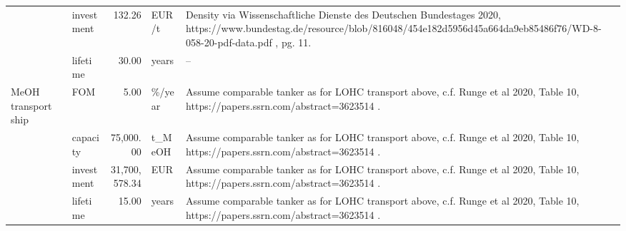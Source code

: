 \begin{longtable}{p{5cm}p{3cm}rp{3cm}p{11cm}}
                      & investment &         132.26 &                             EUR/t &                                                                                                                                              Density via Wissenschaftliche Dienste des Deutschen Bundestages 2020, https://www.bundestag.de/resource/blob/816048/454e182d5956d45a664da9eb85486f76/WD-8-058-20-pdf-data.pdf , pg. 11. \\
                      & lifetime &          30.00 &                             years &                                                                                                                                                                                                                                                                                                                                   -- \\
MeOH transport ship & FOM &           5.00 &                            \%/year &                                                                                                                                                                                                    Assume comparable tanker as for LOHC transport above, c.f. Runge et al 2020, Table 10, https://papers.ssrn.com/abstract=3623514 . \\
                      & capacity &      75,000.00 &                            t\_MeOH &                                                                                                                                                                                                    Assume comparable tanker as for LOHC transport above, c.f. Runge et al 2020, Table 10, https://papers.ssrn.com/abstract=3623514 . \\
                      & investment &  31,700,578.34 &                               EUR &                                                                                                                                                                                                    Assume comparable tanker as for LOHC transport above, c.f. Runge et al 2020, Table 10, https://papers.ssrn.com/abstract=3623514 . \\
                      & lifetime &          15.00 &                             years &                                                                                                                                                                                                    Assume comparable tanker as for LOHC transport above, c.f. Runge et al 2020, Table 10, https://papers.ssrn.com/abstract=3623514 . \\

\end{longtable}
